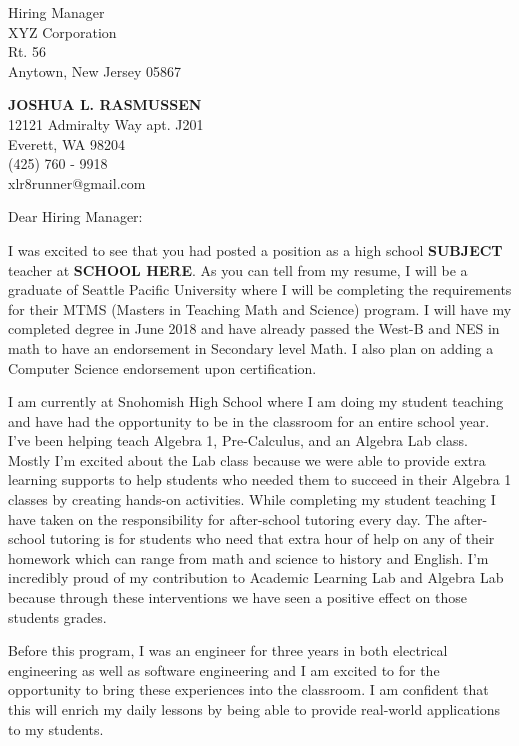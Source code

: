 \documentclass{letter}
\makeatletter
\newcommand{\CVName}{JOSHUA L. RASMUSSEN}
\newcommand{\CVAddressOne}{12121 Admiralty Way apt. J201}
\newcommand{\CVAddressTwo}{Everett, WA 98204}
\newcommand{\CVPhone}{(425) 760 - 9918}
\newcommand{\CVEmail}{xlr8runner@gmail.com}
\makeatother
\begin{document}
\signature{Joshua L. Rasmussen}                  %
\longindentation=0pt                     %
\let\raggedleft\raggedright              %

\begin{letter}{Hiring Manager \\
XYZ Corporation \\
Rt. 56 \\
Anytown, New Jersey 05867}

\begin{center}
{\large\bf \CVName} \\
\CVAddressOne \\ \CVAddressTwo  \\ \CVPhone \\
\CVEmail
\end{center}
\vfill
\opening{Dear Hiring Manager:}

\noindent I was excited to see that you had posted a position as a high school {\bf SUBJECT} teacher at {\bf SCHOOL HERE}.
As you can tell from my resume, I will be a graduate of Seattle Pacific University where I will be completing the requirements for their MTMS (Masters in Teaching Math and Science) program. I will have my completed degree in June 2018 and have already passed the West-B and NES in math to have an endorsement in Secondary level Math.
I also plan on adding a Computer Science endorsement upon certification.

\noindent I am currently at Snohomish High School where I am doing my student teaching and have had the opportunity to be in the classroom for an entire school year. I’ve been helping teach Algebra 1, Pre-Calculus, and an
Algebra Lab class. Mostly I’m excited about the Lab class because we were able to provide extra learning supports to help students who needed them to succeed in their Algebra 1 classes by creating hands-on activities. While completing my student teaching I have taken on the responsibility for after-school tutoring every day. The after-school tutoring is for students who need that extra hour of help on any of their homework which can range from math and science to history and English. I'm incredibly proud of my contribution to Academic Learning Lab and Algebra Lab because through these interventions we have seen a positive effect on those students grades.

\noindent Before this program, I was an engineer for three years in both electrical engineering as well as software engineering and I am excited to for the opportunity to bring these experiences into the classroom. I am confident that this will enrich my daily lessons by being able to provide real-world applications to my students.


\end{letter}
\end{document}
